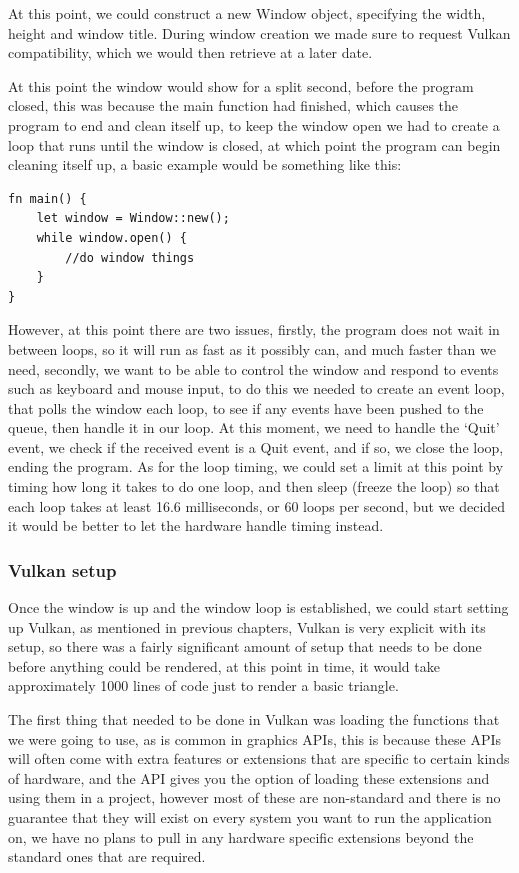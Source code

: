 \documentclass[../report.tex]{subfiles}
\begin{document}
At this point, we could construct a new Window object, specifying the width, height and window title.
During window creation we made sure to request Vulkan compatibility, which we would then retrieve at a later date.

At this point the window would show for a split second, before the program closed, this was because the main function had finished, which causes the program to end and clean itself up, to keep the window open we had to create a loop that runs until the window is closed, at which point the program can begin cleaning itself up, a basic example would be something like this:

\begin{verbatim}
fn main() {
    let window = Window::new();
    while window.open() {
        //do window things
    }
}
\end{verbatim}

However, at this point there are two issues, firstly, the program does not wait in between loops, so it will run as fast as it possibly can, and much faster than we need, secondly, we want to be able to control the window and respond to events such as keyboard and mouse input, to do this we needed to create an event loop, that polls the window each loop, to see if any events have been pushed to the queue, then handle it in our loop. At this moment, we need to handle the `Quit' event, we check if the received event is a Quit event, and if so, we close the loop, ending the program. 
As for the loop timing, we could set a limit at this point by timing how long it takes to do one loop, and then sleep (freeze the loop) so that each loop takes at least 16.6 milliseconds, or 60 loops per second, but we decided it would be better to let the hardware handle timing instead.

\subsubsection{Vulkan setup}
Once the window is up and the window loop is established, we could start setting up Vulkan, as mentioned in previous chapters, Vulkan is very explicit with its setup, so there was a fairly significant amount of setup that needs to be done before anything could be rendered, at this point in time, it would take approximately 1000 lines of code just to render a basic triangle.

The first thing that needed to be done in Vulkan was loading the functions that we were going to use, as is common in graphics APIs, this is because these APIs will often come with extra features or extensions that are specific to certain kinds of hardware, and the API gives you the option of loading these extensions and using them in a project, however most of these are non-standard and there is no guarantee that they will exist on every system you want to run the application on, we have no plans to pull in any hardware specific extensions beyond the standard ones that are required.
\end{document}
